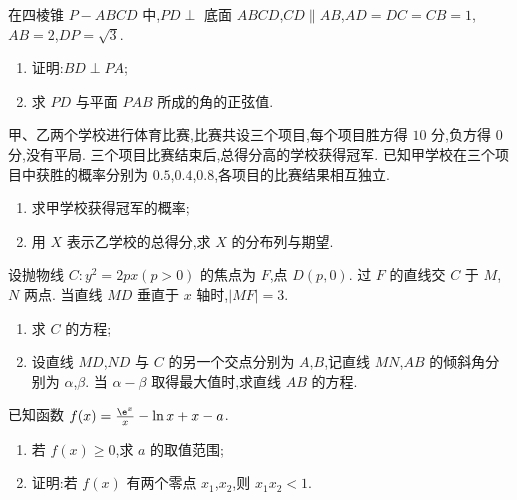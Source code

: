 \begin{problem}
在四棱锥 \(P-ABCD\) 中,\(PD\perp\) 底面 \(ABCD\),\(CD\parallel AB\),\(AD=DC=CB=1\),\(AB=2\),\(DP=\sqrt3\).

\begin{enumerate}
\item 证明:\(BD\perp PA\);
\item 求 \(PD\) 与平面 \(PAB\) 所成的角的正弦值.
\end{enumerate}

\end{problem}

\begin{problem}
甲、乙两个学校进行体育比赛,比赛共设三个项目,每个项目胜方得 \(10\) 分,负方得 \(0\) 分,没有平局. 三个项目比赛结束后,总得分高的学校获得冠军. 已知甲学校在三个项目中获胜的概率分别为 \(0.5\),\(0.4\),\(0.8\),各项目的比赛结果相互独立.

\begin{enumerate}
\item 求甲学校获得冠军的概率;
\item 用 \(X\) 表示乙学校的总得分,求 \(X\) 的分布列与期望.
\end{enumerate}
\end{problem}

\begin{problem}
设抛物线 \(C:y^2=2px\left( p>0 \right)\) 的焦点为 \(F\),点 \(D\left( p,0 \right)\). 过 \(F\) 的直线交 \(C\) 于 \(M\),\(N\) 两点. 当直线 \(MD\) 垂直于 \(x\) 轴时,\(|MF|=3\).

\begin{enumerate}
\item 求 \(C\) 的方程;
\item 设直线 \(MD\),\(ND\) 与 \(C\) 的另一个交点分别为 \(A\),\(B\),记直线 \(MN\),\(AB\) 的倾斜角分别为 \(\alpha\),\(\beta\). 当 \(\alpha-\beta\) 取得最大值时,求直线 \(AB\) 的方程.
\end{enumerate}
\end{problem}

\begin{problem}
已知函数 \(f(x)=\frac{\e^x}{x}-\ln x+x-a\).

\begin{enumerate}
\item 若 \(f(x)\ge 0\),求 \(a\) 的取值范围;
\item 证明:若 \(f(x)\) 有两个零点 \(x_1\),\(x_2\),则 \(x_1x_2<1\).
\end{enumerate}
\end{problem}

